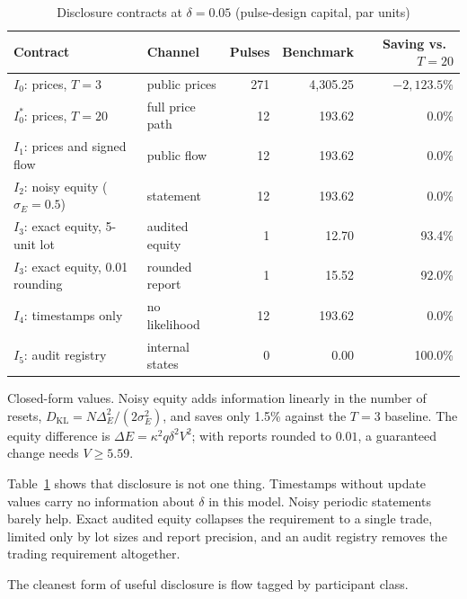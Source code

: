 \documentclass[12pt]{article}
\theoremstyle{definition}
\theoremstyle{remark}
\newcommand{\KL}{D_{\mathrm{KL}}}
\begin{document}
\begin{table}[t]\centering\small
\begin{threeparttable}
\caption{Disclosure contracts at $\delta=0.05$ (pulse-design capital, par units)}\label{tab:contracts}
\begin{tabular}{llrrr}
\toprule
Contract & Channel & Pulses & Benchmark & Saving vs.\ $T=20$\\
\midrule
$I_0$: prices, $T=3$ & public prices & 271 & 4{,}305.25 & $-2{,}123.5\%$\\
$I_0^*$: prices, $T=20$ & full price path & 12 & 193.62 & 0.0\%\\
$I_1$: prices and signed flow & public flow & 12 & 193.62 & 0.0\%\\
$I_2$: noisy equity ($\sigma_E=0.5$) & statement & 12 & 193.62 & 0.0\%\\
$I_3$: exact equity, 5-unit lot & audited equity & 1 & 12.70 & 93.4\%\\
$I_3$: exact equity, 0.01 rounding & rounded report & 1 & 15.52 & 92.0\%\\
$I_4$: timestamps only & no likelihood & 12 & 193.62 & 0.0\%\\
$I_5$: audit registry & internal states & 0 & 0.00 & 100.0\%\\
\bottomrule
\end{tabular}
\begin{tablenotes}\footnotesize\item Closed-form values. Noisy equity adds information linearly in the number of resets, $\KL=N\Delta_E^2/(2\sigma_E^2)$, and saves only 1.5\% against the $T=3$ baseline. The equity difference is $\Delta E=\kappa^2q\delta^2V^2$; with reports rounded to $0.01$, a guaranteed change needs $V\ge5.59$.\end{tablenotes}
\end{threeparttable}
\end{table}

Table~\ref{tab:contracts} shows that disclosure is not one thing. Timestamps without update values carry no information about $\delta$ in this model. Noisy periodic statements barely help. Exact audited equity collapses the requirement to a single trade, limited only by lot sizes and report precision, and an audit registry removes the trading requirement altogether.

The cleanest form of useful disclosure is flow tagged by participant class.
\end{document}
